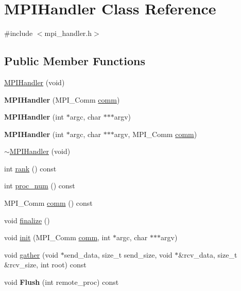 \hypertarget{classMPIHandler}{}\section{M\+P\+I\+Handler Class Reference}
\label{classMPIHandler}


{\ttfamily \#include $<$mpi\+\_\+handler.\+h$>$}

\subsection*{Public Member Functions}
\begin{DoxyCompactItemize}
\item 
\hyperlink{classMPIHandler_a8e61f788368982291ac002e0ff08d0ca}{M\+P\+I\+Handler} (void)
\item 
\hypertarget{classMPIHandler_a2914b355aef4d2c15bfc4fb1af372506}{}{\bfseries M\+P\+I\+Handler} (M\+P\+I\+\_\+\+Comm \hyperlink{classMPIHandler_a680ee1b7658b9cdb02167582f6c5f117}{comm})\label{classMPIHandler_a2914b355aef4d2c15bfc4fb1af372506}

\item 
\hypertarget{classMPIHandler_af2610c4d76f064d57a81deb747fd1bc2}{}{\bfseries M\+P\+I\+Handler} (int $\ast$argc, char $\ast$$\ast$$\ast$argv)\label{classMPIHandler_af2610c4d76f064d57a81deb747fd1bc2}

\item 
\hypertarget{classMPIHandler_a013c78c97961b2bec99f6481781eb107}{}{\bfseries M\+P\+I\+Handler} (int $\ast$argc, char $\ast$$\ast$$\ast$argv, M\+P\+I\+\_\+\+Comm \hyperlink{classMPIHandler_a680ee1b7658b9cdb02167582f6c5f117}{comm})\label{classMPIHandler_a013c78c97961b2bec99f6481781eb107}

\item 
\hyperlink{classMPIHandler_add085a28b64afcb5d76d597dc5dad281}{$\sim$\+M\+P\+I\+Handler} (void)
\item 
int \hyperlink{classMPIHandler_a3cfa337738c084777b96a7797eff6e0f}{rank} () const 
\item 
int \hyperlink{classMPIHandler_ad16df35e43f3a1cc8a83a9a487758864}{proc\+\_\+num} () const 
\item 
M\+P\+I\+\_\+\+Comm \hyperlink{classMPIHandler_a680ee1b7658b9cdb02167582f6c5f117}{comm} () const 
\item 
void \hyperlink{classMPIHandler_ae86917fcf99eb8c2ecd48fa530e739eb}{finalize} ()
\item 
void \hyperlink{classMPIHandler_a7910ea5ae5a63f7c7b8aa1415be994b2}{init} (M\+P\+I\+\_\+\+Comm \hyperlink{classMPIHandler_a680ee1b7658b9cdb02167582f6c5f117}{comm}, int $\ast$argc, char $\ast$$\ast$$\ast$argv)
\item 
void \hyperlink{classMPIHandler_a2aeff06436f5771e59f58ac10896a2bb}{gather} (void $\ast$send\+\_\+data, size\+\_\+t send\+\_\+size, void $\ast$\&rcv\+\_\+data, size\+\_\+t \&rcv\+\_\+size, int root) const 
\item 
\hypertarget{classMPIHandler_a8b761183f536789d2a2a891d3a73104c}{}void {\bfseries Flush} (int remote\+\_\+proc) const \label{classMPIHandler_a8b761183f536789d2a2a891d3a73104c}


\end{DoxyCompactItemize}
